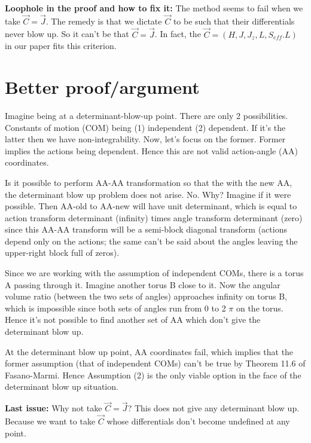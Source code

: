 \documentclass[prd,floatfix,nofootinbib,longbibliography,notitlepage,superscriptaddress]{revtex4-1}
\begin{document}
\textbf{Loophole in the proof and how to fix it:} 
The method seems to fail when we take $\vec{C} = \vec{J}$. The remedy is that
we dictate $\vec{C}$ to be such that their differentials never blow up.
So it can't be that $\vec{C} = \vec{J}$. In fact, the 
$\vec{C} = (H, J, J_z, L, S_{eff}.L)$ in our paper fits this criterion.





\section{Better proof/argument}



Imagine being at a determinant-blow-up point. 
There are only 2 possibilities. Constants of motion (COM) 
being (1) independent (2) dependent. If it's the latter then we have 
non-integrability. Now, let's focus on the former.
Former implies the actions being dependent. Hence this are not valid
action-angle (AA) coordinates.


Is it possible to perform AA-AA transformation so that the with the
new AA, the determinant blow up problem does not arise. No. Why?
Imagine if it were possible. Then AA-old to AA-new will have unit
determinant, which is equal to action transform determinant
(infinity) times
angle transform determinant (zero) since this AA-AA transform
will be a semi-block diagonal transform (actions depend only on the actions; 
the same can't be said about the angles leaving the upper-right block
full of zeros).

Since we are working with the assumption of independent COMs, 
there is a torus A passing through it. Imagine another torus B
close to it. Now the angular volume ratio (between the two sets of angles)
approaches infinity on torus B, which is impossible since both sets of 
angles run from 0 to 2 $\pi$ on the torus. Hence it's not possible to
find another set of AA which don't give the determinant blow up.



At the determinant blow up point,
AA coordinates fail, which implies that the former assumption 
(that of independent COMs) can't be true by Theorem 11.6 of Fasano-Marmi.
Hence Assumption (2) is the only viable option in the face of the
determinant blow up situation.



\textbf{Last issue:} Why not take $\vec{C} = \vec{J}$? This does not give any 
determinant blow up. Because we want to take $\vec{C}$ whose differentials don't 
become undefined at any point.
\end{document}

